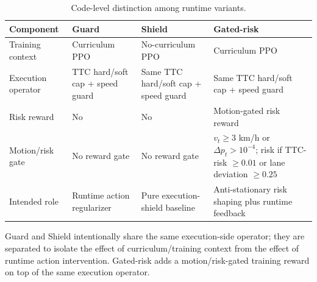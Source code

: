 
\begin{table}[t]
\centering
\caption{Code-level distinction among runtime variants.}
\label{tab_runtime_variant_components}
\scriptsize
\setlength{\tabcolsep}{3.4pt}
\renewcommand{\arraystretch}{1.08}
\begin{tabular}{@{}>{\raggedright\arraybackslash}p{}>{\raggedright\arraybackslash}p{}>{\raggedright\arraybackslash}p{}>{\raggedright\arraybackslash}p{}@{}}
\toprule
Component & Guard & Shield & Gated-risk \\
\midrule
Training context & Curriculum PPO & No-curriculum PPO & Curriculum PPO \\
Execution operator & TTC hard/soft cap + speed guard & Same TTC hard/soft cap + speed guard & Same TTC hard/soft cap + speed guard \\
Risk reward & No & No & Motion-gated risk reward \\
Motion/risk gate & No reward gate & No reward gate & $v_t\geq3$ km/h or $\Delta p_t>10^{-4}$; risk if TTC-risk $\geq0.01$ or lane deviation $\geq0.25$ \\
Intended role & Runtime action regularizer & Pure execution-shield baseline & Anti-stationary risk shaping plus runtime feedback \\
\bottomrule
\end{tabular}
\begin{tablenotes}
\item Guard and Shield intentionally share the same execution-side operator; they are separated to isolate the effect of curriculum/training context from the effect of runtime action intervention. Gated-risk adds a motion/risk-gated training reward on top of the same execution operator.
\end{tablenotes}
\end{table}
